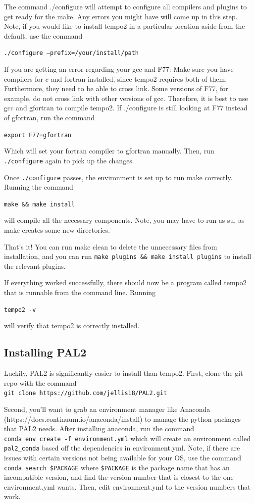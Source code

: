 \documentclass[12pt]{article}
\newcommand{\code}[1]{\colorbox{light-gray}{\texttt{#1}}}
\begin{document}
The command ./configure will attempt to configure all compilers and plugins to
get ready for the make. Any errors you might have will come up in this step.
Note, if you would like to install tempo2 in a particular location aside from
the default, use the command
	
\code{./configure --prefix=/your/install/path}

If you are getting an error regarding your gcc and F77:
Make sure you have compilers for c and fortran installed, since tempo2 requires
both of them. Furthermore, they need to be able to cross link.
Some versions of F77, for example, do not cross link with other versions of gcc.
Therefore, it is best to use gcc and gfortran to compile tempo2. If ./configure
is still looking at F77 instead of gfortran, run the command

\code{export F77=gfortran}

Which will set your fortran compiler to gfortran manually. Then, run
\texttt{./configure}
again to pick up the changes.

Once \texttt{./configure} passes, the environment is set up to run make correctly.
Running the command

\code{make \&\& make install}

will compile all the necessary components. Note, you may have to run as su, as
make creates some new directories.

That's it! You can run make clean to delete the unnecessary files from
installation, and you can run \texttt{make plugins \&\& make install plugins} to install
the relevant plugins. 

If everything worked successfully, there should now be a program called tempo2 that
is runnable from the command line. Running 

\code{tempo2 -v}

will verify that tempo2 is correctly installed.

\subsection{Installing PAL2}

Luckily, PAL2 is significantly easier to install than tempo2.
First, clone the git repo with the command
\\
\code{git clone https://github.com/jellis18/PAL2.git}

Second, you'll want to grab an environment manager like Anaconda
(https://docs.continuum.io/anaconda/install) to manage the python packages that
PAL2 needs. After installing anaconda, run the command
\\
\code{conda env create -f environment.yml}
which will create an environment called \texttt{pal2\_conda} based off the dependencies in
environment.yml. Note, if there are issues with certain versions not being
available for your OS, use the command 
\\
\code{conda search \$PACKAGE}
where \texttt{\$PACKAGE} is the package name that has an incompatible version, and find
the version number that is closest to the one environment.yml wants. Then, edit
environment.yml to the version numbers that work.
	
\end{document}
